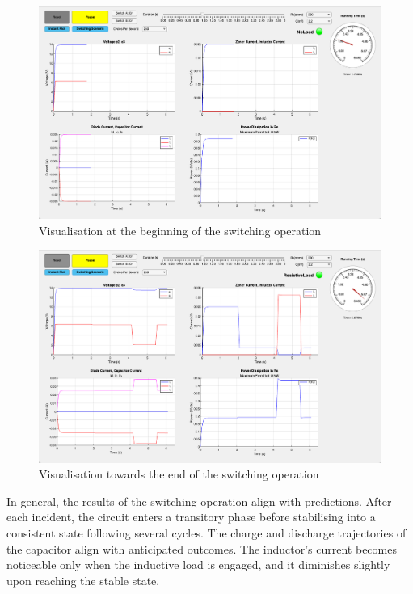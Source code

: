 \begin{figure}[H]
    \centering
   	\includegraphics[width=\textwidth]{graphics/visualisation/switching_1}
	\caption{Visualisation at the beginning of the switching operation}
\end{figure}
\begin{figure}[H]
    \centering
   	\includegraphics[width=\textwidth]{graphics/visualisation/switching_4}
	\caption{Visualisation towards the end of the switching operation}
\end{figure}
In general, the results of the switching operation align with predictions. After each incident, the circuit enters a transitory phase before stabilising into a consistent state following several cycles. The charge and discharge trajectories of the capacitor align with anticipated outcomes. The inductor's current becomes noticeable only when the inductive load is engaged, and it diminishes slightly upon reaching the stable state.


